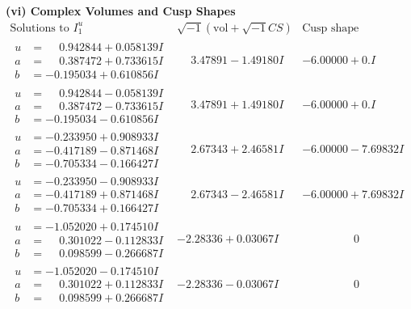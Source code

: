 \documentclass[1p]{elsarticle_modified}
\theoremstyle{definition}
\newcommand{\I}{\sqrt{-1}}
\begin{document}
\newpage\flushleft \textbf{(vi) Complex Volumes and Cusp Shapes}
$$\begin{array}{c|c|c}  
\text{Solutions to }I^u_{1}& \I (\text{vol} + \sqrt{-1}CS) & \text{Cusp shape}\\
 \hline 
\begin{aligned}
u &= \phantom{-}0.942844 + 0.058139 I \\
a &= \phantom{-}0.387472 + 0.733615 I \\
b &= -0.195034 + 0.610856 I\end{aligned}
 & \phantom{-}3.47891 - 1.49180 I & -6.00000 + 0. I\phantom{ +0.000000I} \\ \hline\begin{aligned}
u &= \phantom{-}0.942844 - 0.058139 I \\
a &= \phantom{-}0.387472 - 0.733615 I \\
b &= -0.195034 - 0.610856 I\end{aligned}
 & \phantom{-}3.47891 + 1.49180 I & -6.00000 + 0. I\phantom{ +0.000000I} \\ \hline\begin{aligned}
u &= -0.233950 + 0.908933 I \\
a &= -0.417189 - 0.871468 I \\
b &= -0.705334 - 0.166427 I\end{aligned}
 & \phantom{-}2.67343 + 2.46581 I & -6.00000 - 7.69832 I \\ \hline\begin{aligned}
u &= -0.233950 - 0.908933 I \\
a &= -0.417189 + 0.871468 I \\
b &= -0.705334 + 0.166427 I\end{aligned}
 & \phantom{-}2.67343 - 2.46581 I & -6.00000 + 7.69832 I \\ \hline\begin{aligned}
u &= -1.052020 + 0.174510 I \\
a &= \phantom{-}0.301022 - 0.112833 I \\
b &= \phantom{-}0.098599 - 0.266687 I\end{aligned}
 & -2.28336 + 0.03067 I & \phantom{-0.000000 } 0 \\ \hline\begin{aligned}
u &= -1.052020 - 0.174510 I \\
a &= \phantom{-}0.301022 + 0.112833 I \\
b &= \phantom{-}0.098599 + 0.266687 I\end{aligned}
 & -2.28336 - 0.03067 I & \phantom{-0.000000 } 0 \\ \hline\begin{aligned}

\end{aligned}
\end{array}$$
\end{document}

